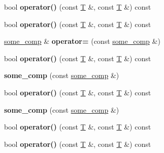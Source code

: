 \begin{DoxyCompactItemize}
\item 
\mbox{\label{structsome__comp_a6a7124af43ee189c025dee7d7482eaba}} 
bool {\bfseries operator()} (const \mbox{\hyperlink{struct_t}{T}} \&, const \mbox{\hyperlink{struct_t}{T}} \&) const
\item 
\mbox{\label{structsome__comp_a6a7124af43ee189c025dee7d7482eaba}} 
bool {\bfseries operator()} (const \mbox{\hyperlink{struct_t}{T}} \&, const \mbox{\hyperlink{struct_t}{T}} \&) const
\item 
\mbox{\label{structsome__comp_a3cf31772d92b1481d71121d650f28a01}} 
\mbox{\hyperlink{structsome__comp}{some\+\_\+comp}} \& {\bfseries operator=} (const \mbox{\hyperlink{structsome__comp}{some\+\_\+comp}} \&)
\item 
\mbox{\label{structsome__comp_a6a7124af43ee189c025dee7d7482eaba}} 
bool {\bfseries operator()} (const \mbox{\hyperlink{struct_t}{T}} \&, const \mbox{\hyperlink{struct_t}{T}} \&) const
\item 
\mbox{\label{structsome__comp_acb6b551db492c34e1354464e12b57857}} 
{\bfseries some\+\_\+comp} (const \mbox{\hyperlink{structsome__comp}{some\+\_\+comp}} \&)
\item 
\mbox{\label{structsome__comp_a6a7124af43ee189c025dee7d7482eaba}} 
bool {\bfseries operator()} (const \mbox{\hyperlink{struct_t}{T}} \&, const \mbox{\hyperlink{struct_t}{T}} \&) const
\item 
\mbox{\label{structsome__comp_acb6b551db492c34e1354464e12b57857}} 
{\bfseries some\+\_\+comp} (const \mbox{\hyperlink{structsome__comp}{some\+\_\+comp}} \&)
\item 
\mbox{\label{structsome__comp_a6a7124af43ee189c025dee7d7482eaba}} 
bool {\bfseries operator()} (const \mbox{\hyperlink{struct_t}{T}} \&, const \mbox{\hyperlink{struct_t}{T}} \&) const
\item 
\mbox{\label{structsome__comp_a6a7124af43ee189c025dee7d7482eaba}} 
bool {\bfseries operator()} (const \mbox{\hyperlink{struct_t}{T}} \&, const \mbox{\hyperlink{struct_t}{T}} \&) const

\end{DoxyCompactItemize}
